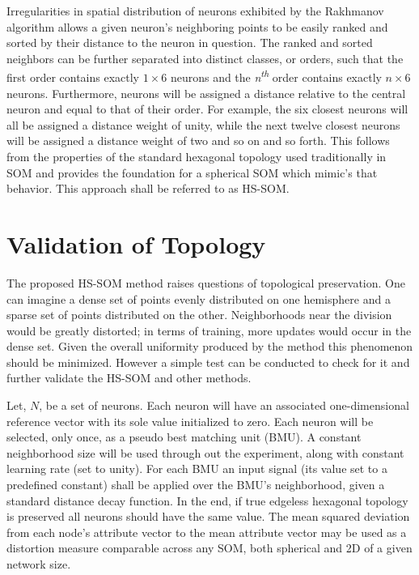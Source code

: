 \documentclass[12pt]{article}
\begin{document}
Irregularities in spatial distribution of neurons exhibited by the Rakhmanov
algorithm allows a given neuron's neighboring points to be easily ranked
and sorted by their distance to the neuron in question.  The ranked and sorted
neighbors can be further separated into distinct classes, or orders, such that
the first order contains exactly \begin{math}1\times6\end{math} neurons and
the \textit{n\textsuperscript{th}} order contains exactly
\begin{math}n\times6\end{math} neurons.  Furthermore, neurons will be assigned
a distance relative to the central neuron and equal to that of their order.
For example, the six closest neurons will all be assigned a distance weight of
unity, while the next twelve closest neurons will be assigned a distance
weight of two and so on and so forth.  This follows from the properties of the
standard hexagonal topology used traditionally in SOM and provides the
foundation for a spherical SOM which mimic's that behavior.  This approach
shall be referred to as HS-SOM.

\section{Validation of Topology}
The proposed HS-SOM method raises questions of topological preservation.  One
can imagine a dense set of points evenly distributed on one hemisphere and a
sparse set of points distributed on the other. Neighborhoods near the division
would be greatly distorted; in terms of training, more updates would occur in
the dense set.  Given the overall uniformity produced by the
\citeauthor{Rakhmanov94} method this phenomenon should be minimized. However a
simple test can be conducted to check for it and further validate the HS-SOM
and other methods.

Let, \begin{math}N\end{math}, be a set of neurons.  Each neuron will have an
associated one-dimensional reference vector with its sole value initialized to
zero. Each neuron will be selected, only once, as a pseudo best matching unit
(BMU).  A constant neighborhood size will be used through out the experiment,
along with constant learning rate (set to unity).  For each BMU an input
signal (its value set to a predefined constant) shall be applied over the
BMU's neighborhood, given a standard distance decay function.  In the end,
if true edgeless hexagonal topology is preserved all neurons should have the
same value. The mean squared deviation from each node's attribute vector to
the mean attribute vector may be used as a distortion measure comparable
across any SOM, both spherical and 2D of a given network size.
\end{document}
